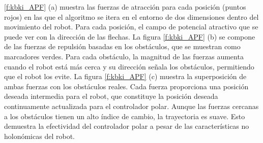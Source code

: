 \ref{f:kbki_APF} (a) muestra las fuerzas de atracción para cada posición (puntos rojos) en 
las que el algoritmo se itera en el entorno de dos dimensiones dentro del movimiento del 
robot. Para cada posición, el campo de potencial atractivo que se puede ver con la dirección 
de las flechas. La figura \ref{f:kbki_APF} (b) se compone de las fuerzas de repulsión basadas en 
los obstáculos, que se muestran como marcadores verdes. Para cada obstáculo, la magnitud de 
las fuerzas aumenta cuando el robot está más cerca y su dirección señala los obstáculos, permitiendo 
que el robot los evite. La figura \ref{f:kbki_APF} (c) muestra la superposición de ambas fuerzas 
con los obstáculos reales. Cada fuerza proporciona una posición deseada intermedia para el 
robot, que constituye la posición deseada continuamente actualizada para el controlador 
polar. Aunque las fuerzas cercanas a los obstáculos tienen un alto índice de cambio, la 
trayectoria es suave. Esto demuestra la efectividad del controlador polar a pesar de las 
características no holonómicas del robot.

